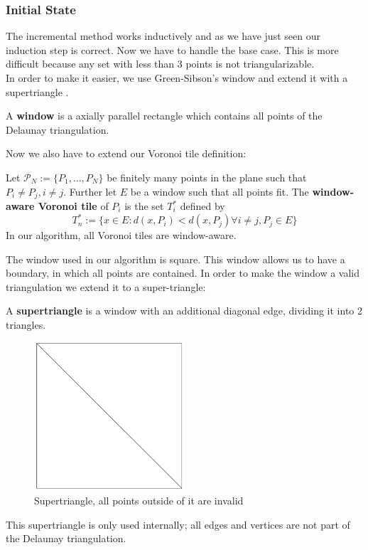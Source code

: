 \subsubsection{Initial State}
The incremental method works inductively and as we have just seen our induction step is correct. Now we have to handle the base case. This is more difficult because any set with less than 3 points is not triangularizable.\\
In order to make it easier, we use Green-Sibson's window \cite{Green1978} and extend it with a supertriangle \cite{PyDelaunay}.
\begin{definition}[Window]
A \textbf{window} is a axially parallel rectangle which contains all points of the Delaunay triangulation.
\end{definition}
Now we also have to extend our Voronoi tile definition:
\begin{definition}
Let $\mathcal{P}_N := \{P_1,\dots, P_N\}$ be finitely many points in the plane such that $P_i \neq P_j, i \neq j$.  Further let $E$ be a window such that all points fit. The \textbf{window-aware Voronoi tile} of $P_i$ is the set $T_i^*$ defined by
\[
T_n^* := \{ x \in E : d(x, P_i) < d(x, P_j) \forall i \neq j, P_j \in E  \}
\]
In our algorithm, all Voronoi tiles are window-aware.
\end{definition}
The window used in our algorithm is square. This window allows us to have a boundary, in which all points are contained. In order to make the window a valid triangulation we extend it to a super-triangle:
\begin{definition}[Supertriangle]
A \textbf{supertriangle} is a window with an additional diagonal edge, dividing it into 2 triangles.
\end{definition}
\begin{figure}[H]
    \centering
    \includegraphics[width=0.5\textwidth]{supertriangle.png}
    \caption{Supertriangle, all points outside of it are invalid}
    \label{fig:my_label}
\end{figure}
This supertriangle is only used internally; all edges and vertices are not part of the Delaunay triangulation.
